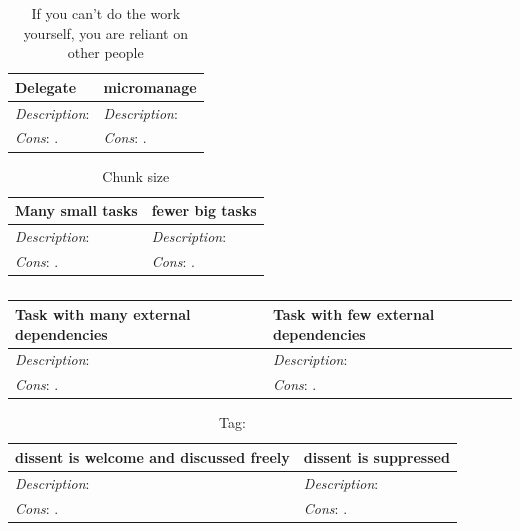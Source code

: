 \begin{center}
\begin{table}[ht]
\begin{tabular}{ | m{\dilemmatablewidth}| m{\dilemmatablewidth} | } 
  \hline
  \textbf{Delegate} & 
  \textbf{micromanage} \\ 
  \hline
  \textit{Description}:  & 
  \textit{Description}:  \\ 
  \hline
  \textit{Cons}: . & 
  \textit{Cons}: . \\  
  \hline
\end{tabular}
\caption{If you can't do the work yourself, you are reliant on other people
}
\label{table:oversight_delegate_or_micromanage}
\end{table}
\end{center}

\begin{center}
\begin{table}[ht]
\begin{tabular}{ | m{\dilemmatablewidth}| m{\dilemmatablewidth} | } 
  \hline
  \textbf{Many small tasks} & 
  \textbf{fewer big tasks} \\ 
  \hline
  \textit{Description}:  & 
  \textit{Description}:  \\ 
  \hline
  \textit{Cons}: . & 
  \textit{Cons}: . \\  
  \hline
\end{tabular}
\caption{Chunk size
}
\label{table:chunk_size}
\end{table}
\end{center}

\begin{center}
\begin{table}[ht]
\begin{tabular}{ | m{\dilemmatablewidth}| m{\dilemmatablewidth} | } 
  \hline
  \textbf{Task with many external dependencies} & 
  \textbf{Task with few external dependencies} \\ 
  \hline
  \textit{Description}:  & 
  \textit{Description}:  \\ 
  \hline
  \textit{Cons}: . & 
  \textit{Cons}: . \\  
  \hline
\end{tabular}
\caption{
}
\label{table:number_of_external dependencies}
\end{table}
\end{center}


\begin{center}
\begin{table}[ht]
\begin{tabular}{ | m{\dilemmatablewidth}| m{\dilemmatablewidth} | } 
  \hline
  \textbf{dissent is welcome and discussed freely} & 
  \textbf{dissent is suppressed} \\ 
  \hline
  \textit{Description}:  & 
  \textit{Description}:  \\ 
  \hline
  \textit{Cons}: . & 
  \textit{Cons}: . \\  
  \hline
\end{tabular}
\caption{
{\tiny Tag: }
}
\label{table:how_dissent_is_responded_to}
\end{table}
\end{center}


